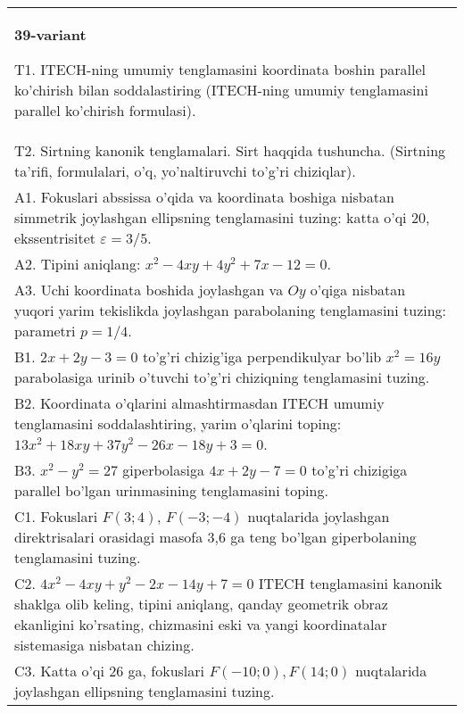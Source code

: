 \documentclass{article}
\begin{document}
\begin{tabular}{m{17cm}}
\textbf{39-variant}
\newline

T1. ITECH-ning umumiy tenglamasini koordinata boshin parallel ko'chirish bilan soddalastiring (ITECH-ning umumiy tenglamasini parallel ko'chirish formulasi).\\

T2. Sirtning kanonik tenglamalari. Sirt haqqida tushuncha. (Sirtning ta'rifi, formulalari, o'q, yo'naltiruvchi to'g'ri chiziqlar).\\

A1. Fokuslari abssissa o'qida va koordinata boshiga nisbatan simmetrik joylashgan ellipsning tenglamasini tuzing: katta o'qi $20$, ekssentrisitet $\varepsilon=3/5$.\\

A2. Tipini aniqlang: $x^{2}-4xy+4y^{2}+7x-12=0$.\\

A3. Uchi koordinata boshida joylashgan va $Oy$ o'qiga nisbatan yuqori yarim tekislikda joylashgan parabolaning tenglamasini tuzing: parametri $p=1/4$.\\

B1. $2x + 2y - 3 = 0$ to'g'ri chizig'iga perpendikulyar bo'lib $x^{2} = 16y$ parabolasiga urinib o'tuvchi to'g'ri chiziqning tenglamasini tuzing.  \\

B2. Koordinata o'qlarini almashtirmasdan ITECH umumiy tenglamasini soddalashtiring, yarim o'qlarini toping: $13x^{2} + 18xy + 37y^{2} - 26x - 18y + 3 = 0$.  \\

B3. $x^{2} - y^{2} = 27$ giperbolasiga $4x + 2y - 7 = 0$ to'g'ri chizigiga parallel bo'lgan urinmasining tenglamasini toping.  \\

C1. Fokuslari $F(3;4)$, $F(-3;-4)$ nuqtalarida joylashgan direktrisalari orasidagi masofa 3,6 ga teng bo'lgan giperbolaning tenglamasini tuzing.  \\

C2. $4x^{2} - 4xy + y^{2} - 2x - 14y + 7 = 0$ ITECH tenglamasini kanonik shaklga olib keling, tipini aniqlang, qanday geometrik obraz ekanligini ko'rsating, chizmasini eski va yangi koordinatalar sistemasiga nisbatan chizing.  \\

C3. Katta o'qi 26 ga, fokuslari $F( - 10;0), F(14;0)$ nuqtalarida joylashgan ellipsning tenglamasini tuzing.  \\

\end{tabular}
\vspace{1cm}
\end{document}
